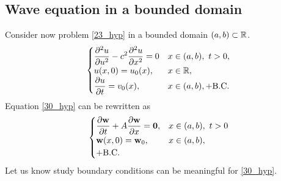 \subsection{Wave equation in a bounded domain}
Consider now problem \eqref{23_hyp} in a bounded domain \((a,b) \subset \mathbb{R}\). 
\begin{equation}
    \begin{cases}
        \displaystyle \partialderivative{^2 u}{u^2} - c^2 \partialderivative{^2 u}{x^2} = 0 & x \in (a,b), \ t > 0, \\
        u(x,0) = u_0(x), & x \in \real, \\
        \displaystyle \partialderivative{u}{t}(x,0) = v_0(x), & x \in (a,b), 
        + \txt{B.C.} 
    \end{cases}
    \label{30_hyp}
\end{equation}
Equation \eqref{30_hyp} can be rewritten as 
\begin{equation}
    \begin{cases}
        \displaystyle\partialderivative{\vect{w}}{t} + A \partialderivative{\vect{w}}{x} = \vect{0}, & x\in (a,b), \ t > 0 \\
        \vect{w}(x,0) = \vect{w}_0, & x \in (a,b), \\
        + \txt{B.C.}
    \end{cases}
    \label{31_hyp}
\end{equation}
Let us know study boundary conditions can be meaningful for \eqref{30_hyp}.

